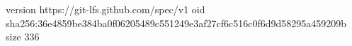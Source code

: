 version https://git-lfs.github.com/spec/v1
oid sha256:36e4859be384ba0f06205489c551249e3af27cf6c516c0f6d9d58295a459209b
size 336
